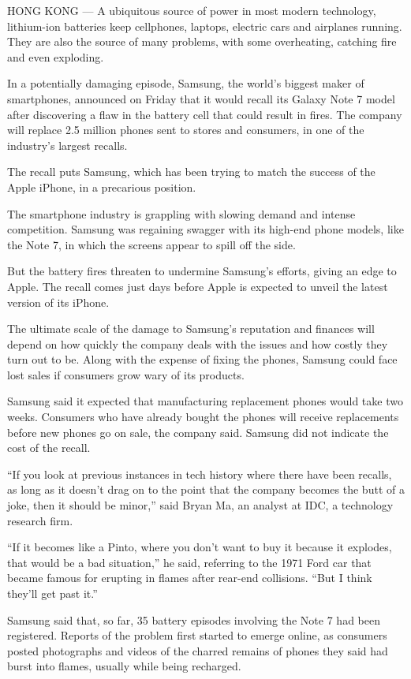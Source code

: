 HONG KONG --- A ubiquitous source of power in most modern technology,
lithium-ion batteries keep cellphones, laptops, electric cars and
airplanes running. They are also the source of many problems, with some
overheating, catching fire and even exploding.

In a potentially damaging episode, Samsung, the world's biggest maker of
smartphones, announced on Friday that it would recall its Galaxy Note 7
model after discovering a flaw in the battery cell that could result in
fires. The company will replace 2.5 million phones sent to stores and
consumers, in one of the industry's largest recalls.

The recall puts Samsung, which has been trying to match the success of
the Apple iPhone, in a precarious position.

The smartphone industry is grappling with slowing demand and intense
competition. Samsung was regaining swagger with its high-end phone
models, like the Note 7, in which the screens appear to spill off the
side.

But the battery fires threaten to undermine Samsung's efforts, giving an
edge to Apple. The recall comes just days before Apple is expected to
unveil the latest version of its iPhone.

The ultimate scale of the damage to Samsung's reputation and finances
will depend on how quickly the company deals with the issues and how
costly they turn out to be. Along with the expense of fixing the phones,
Samsung could face lost sales if consumers grow wary of its products.

Samsung said it expected that manufacturing replacement phones would
take two weeks. Consumers who have already bought the phones will
receive replacements before new phones go on sale, the company said.
Samsung did not indicate the cost of the recall.

``If you look at previous instances in tech history where there have
been recalls, as long as it doesn't drag on to the point that the
company becomes the butt of a joke, then it should be minor,'' said
Bryan Ma, an analyst at IDC, a technology research firm.

``If it becomes like a Pinto, where you don't want to buy it because it
explodes, that would be a bad situation,'' he said, referring to the
1971 Ford car that became famous for erupting in flames after rear-end
collisions. ``But I think they'll get past it.''

Samsung said that, so far, 35 battery episodes involving the Note 7 had
been registered. Reports of the problem first started to emerge online,
as consumers posted photographs and videos of the charred remains of
phones they said had burst into flames, usually while being recharged.


